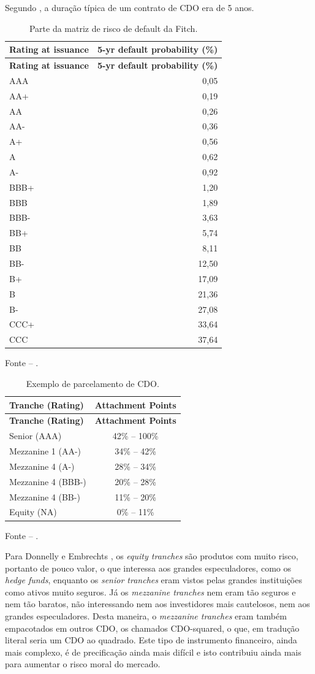 \documentclass[
	12pt,				%
	oneside,			%
	a4paper,			%
	chapter=TITLE,		%
	section=TITLE,		%
	english,			%
	brazil				%
	]{abntex2}
\newcommand{\bcenter}{\begin{center}}
\newcommand{\ecenter}{\end{center}}
\begin{document}
\begin{refsection}
Segundo \textcite{watts}, a duração típica de um contrato de \gls{CDO} era de 5 anos.

\bcenter
\begin{longtable}[]{@{}lr@{}}
\caption{Parte da matriz de risco de default da Fitch.}\tabularnewline
\toprule
\textbf{Rating at issuance} & \textbf{5-yr default probability (\%)}\tabularnewline
\midrule
\endfirsthead
\toprule
\textbf{Rating at issuance} & \textbf{5-yr default probability (\%)}\tabularnewline
\midrule
\endhead
AAA & 0,05\tabularnewline
AA+ & 0,19\tabularnewline
AA & 0,26\tabularnewline
AA- & 0,36\tabularnewline
A+ & 0,56\tabularnewline
A & 0,62\tabularnewline
A- & 0,92\tabularnewline
BBB+ & 1,20\tabularnewline
BBB & 1,89\tabularnewline
BBB- & 3,63\tabularnewline
BB+ & 5,74\tabularnewline
BB & 8,11\tabularnewline
BB- & 12,50\tabularnewline
B+ & 17,09\tabularnewline
B & 21,36\tabularnewline
B- & 27,08\tabularnewline
CCC+ & 33,64\tabularnewline
CCC & 37,64\tabularnewline
\bottomrule
\end{longtable}
\small Fonte -- \textcite{watts}.
\begin{longtable}[]{@{}lc@{}}
\caption{Exemplo de parcelamento de \gls{CDO}.}\tabularnewline
\toprule
\textbf{Tranche (Rating)} & \textbf{Attachment Points}\tabularnewline
\midrule
\endfirsthead
\toprule
\textbf{Tranche (Rating)} & \textbf{Attachment Points}\tabularnewline
\midrule
\endhead
Senior (AAA) & 42\% -- 100\%\tabularnewline
Mezzanine 1 (AA-) & 34\% -- 42\%\tabularnewline
Mezzanine 4 (A-) & 28\% -- 34\%\tabularnewline
Mezzanine 4 (BBB-) & 20\% -- 28\%\tabularnewline
Mezzanine 4 (BB-) & 11\% -- 20\%\tabularnewline
Equity (NA) & 0\% -- 11\%\tabularnewline
\bottomrule
\end{longtable}
\small Fonte -- \textcite{watts}.

\ecenter

Para Donnelly e Embrechts \autocite[20]{devil}, os \emph{equity tranches} são produtos com
muito risco, portanto de pouco valor, o que interessa aos grandes especuladores,
como os \emph{hedge funds}, enquanto os \emph{senior tranches} eram vistos pelas grandes
instituições como ativos muito seguros. Já os \emph{mezzanine tranches} nem eram tão
seguros e nem tão baratos, não interessando nem aos investidores mais cautelosos,
nem aos grandes especuladores. Desta maneira, o \emph{mezzanine tranches} eram
também empacotados em outros \gls{CDO}, os chamados \gls{CDO}-squared, o que, em
tradução literal seria um \gls{CDO} ao quadrado. Este tipo de instrumento
financeiro, ainda mais complexo, é de precificação ainda mais difícil e isto
contribuiu ainda mais para aumentar o risco moral do mercado.


\end{refsection}
\end{document}
